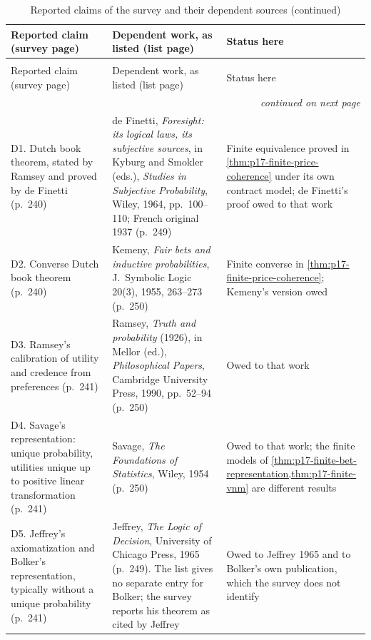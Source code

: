 \begin{longtable}{@{}p{.28\linewidth}p{.32\linewidth}p{.30\linewidth}@{}}
\caption{Reported claims of the survey and their dependent sources.}
\label{tab:p15-w02b-p15-022-dependent-sources}\\
\toprule Reported claim (survey page) & Dependent work, as listed (list page) & Status here \\
\midrule\endfirsthead
\caption[]{Reported claims of the survey and their dependent sources (continued)}\\
\toprule Reported claim (survey page) & Dependent work, as listed (list page) & Status here \\
\midrule\endhead
\midrule\multicolumn{3}{r}{\emph{continued on next page}}\\
\endfoot
\endlastfoot
D1. Dutch book theorem, stated by Ramsey and proved by de Finetti (p.~240) &
de Finetti, \emph{Foresight: its logical laws, its subjective sources}, in
Kyburg and Smokler (eds.), \emph{Studies in Subjective Probability}, Wiley,
1964, pp.~100--110; French original 1937 (p.~249) &
Finite equivalence proved in \cref{thm:p17-finite-price-coherence} under
its own contract model; de Finetti's proof owed to that work \\
D2. Converse Dutch book theorem (p.~240) &
Kemeny, \emph{Fair bets and inductive probabilities}, J.\ Symbolic Logic
20(3), 1955, 263--273 (p.~250) &
Finite converse in \cref{thm:p17-finite-price-coherence}; Kemeny's
version owed \\
D3. Ramsey's calibration of utility and credence from preferences (p.~241) &
Ramsey, \emph{Truth and probability} (1926), in Mellor (ed.),
\emph{Philosophical Papers}, Cambridge University Press, 1990, pp.~52--94
(p.~250) &
Owed to that work \\
D4. Savage's representation: unique probability, utilities unique up to
positive linear transformation (p.~241) &
Savage, \emph{The Foundations of Statistics}, Wiley, 1954 (p.~250) &
Owed to that work; the finite models of
\cref{thm:p17-finite-bet-representation,thm:p17-finite-vnm} are different
results \\
D5. Jeffrey's axiomatization and Bolker's representation, typically without
a unique probability (p.~241) &
Jeffrey, \emph{The Logic of Decision}, University of Chicago Press, 1965
(p.~249). The list gives no separate entry for Bolker; the survey reports
his theorem as cited by Jeffrey &
Owed to Jeffrey 1965 and to Bolker's own publication, which the survey does
not identify \\

\end{longtable}
